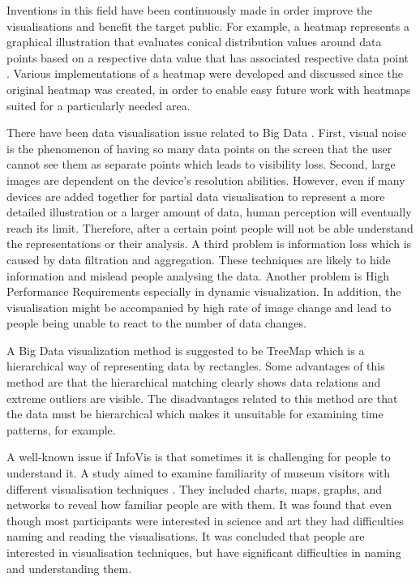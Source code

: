 \documentclass{l4proj}
\begin{document}
Inventions in this field have been continuously made in order improve the visualisations and benefit the target public. For example, a heatmap represents a graphical illustration that evaluates conical distribution values around data points based on a respective data value that has associated respective data point \cite{cardno2014data}. Various implementations of a heatmap were developed and discussed since the original heatmap was created, in order to enable easy future work with heatmaps suited for a particularly needed area.

There have been data visualisation issue related to Big Data \cite{gorodov2013analytical}. First, visual noise is the phenomenon of having so many data points on the screen that the user cannot see them as separate points which leads to visibility loss. Second, large images are dependent on the device's resolution abilities. However, even if many devices are added together for partial data visualisation to represent a more detailed illustration or a larger amount of data, human perception will eventually reach its limit. Therefore, after a certain point people will not be able understand the representations or their analysis. A third problem is information loss which is caused by data filtration and aggregation. These techniques are likely to hide information and mislead people analysing the data. Another problem is High Performance Requirements especially in dynamic visualization. In addition, the visualisation might be accompanied by high rate of image change and lead to people being unable to react to the number of data changes. 

A Big Data visualization method is suggested to be TreeMap \cite{gorodov2013analytical} which is a hierarchical way of representing data by rectangles. Some advantages of this method are that the hierarchical matching clearly shows data relations and extreme outliers are visible. The disadvantages related to this method are that the data must be hierarchical which makes it unsuitable for examining time patterns, for example. 

A well-known issue if InfoVis is that sometimes it is challenging for people to understand it. A study aimed to examine familiarity of museum visitors with different visualisation techniques \cite{borner2015investigating}. They included charts, maps, graphs, and networks to reveal how familiar people are with them. It was found that even though most participants were interested in science and art they had difficulties naming and reading the visualisations. It was concluded that people are interested in visualisation techniques, but have significant difficulties in naming and understanding them. 
\end{document}
